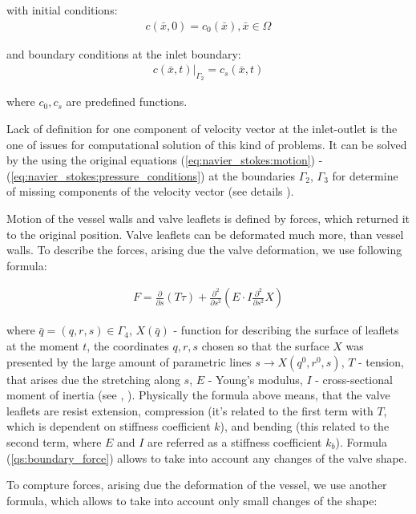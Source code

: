 \documentclass[runningheads,a4paper]{llncs}
\begin{document}
with initial conditions:
\begin{gather}
    \label{eq:convection:conditions}
    c(\bar{x}, 0) = c_0(\bar{x}), \bar{x} \in \Omega
\end{gather}

and boundary conditions at the inlet boundary:
\begin{gather}
    \label{eq:convection:conditions}
    c(\bar{x}, t)|_{\Gamma_2} = c_s(\bar{x}, t)
\end{gather}

where $c_0, c_s$ are predefined functions.

Lack of definition for one component of velocity vector at the inlet-outlet is the one of issues for computational solution of this kind of problems.
It can be solved by the using the original equations (\ref{eq:navier_stokes:motion}) - (\ref{eq:navier_stokes:pressure_conditions}) at the boundaries
$\Gamma_2$, $\Gamma_3$ for determine of missing components of the velocity vector (see details \cite{gummel}).

Motion of the vessel walls and valve leaflets is defined by forces, which returned it to the original position. Valve leaflets can be deformated much more,
than vessel walls. To describe the forces, arising due the valve deformation, we use following formula:

\begin{gather}
    \label{eq:boundary_force}
    F = \frac{\partial}{\partial s} (T \tau) + \frac{\partial^2}{\partial s^2} (E \cdot I \frac{\partial^2}{\partial s^2} X)
\end{gather}

where $\bar{q} = (q, r, s) \in \Gamma_4$, $X(\bar{q})$ - function for describing the surface of leaflets at the moment $t$, the coordinates $q, r, s$ chosen so
that the surface $X$ was presented by the large amount of parametric lines $s \rightarrow X(q^0, r^0, s)$, $T$ - tension, that arises due the stretching along $s$,
$E$ - Young's modulus, $I$ - cross-sectional moment of inertia (see \cite{boyce_2011}, \cite{pescin_2002}). Physically the formula above means,
that the valve leaflets are resist extension, compression (it's related to the first term with $T$, which is dependent on stiffness coefficient $k$),
and bending (this related to the second term, where $E$ and $I$ are referred as a stiffness coefficient $k_b$). Formula (\ref{qs:boundary_force}) allows to
take into account any changes of the valve shape.

To compture forces, arising due the deformation of the vessel, we use another formula, which allows to take into account only small changes of the shape:
\end{document}
